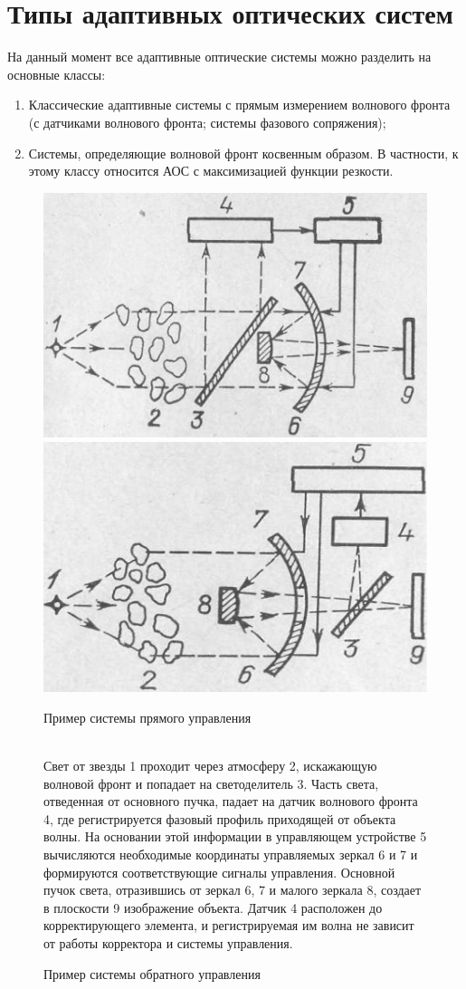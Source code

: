 \documentclass[pscyr]{hedwork}
\begin{document}
\section{Типы адаптивных оптических систем}

На данный момент все адаптивные оптические системы можно разделить на 
основные классы:
\begin{enumerate}
  \item Классические адаптивные системы с прямым измерением волнового
    фронта (с датчиками волнового фронта; системы фазового сопряжения);
  \item Системы, определяющие волновой фронт косвенным образом. В частности, к
    этому классу относится АОС с максимизацией функции резкости. 
\end{enumerate}

\begin{figure}[ht]
  \center
  \includegraphics[width=.47\textwidth]{ds_1_1} \hfill
  \includegraphics[width=.47\textwidth]{ds_1_2} \\
  \parbox{.47\textwidth}{ \caption{Пример системы прямого управления}
    \label{pic1} } \hfill
  \parbox{.47\textwidth}{ \caption{Пример системы обратного управления}
    \label{pic2} } \\
  {
  \footnotesize
    Свет от звезды 1 проходит через атмосферу 2, искажающую волновой фронт и
    попадает на светоделитель 3. Часть света, отведенная от основного пучка,
    падает на датчик волнового фронта 4, где регистрируется фазовый профиль
    приходящей от объекта волны. На основании этой информации в управляющем
    устройстве 5 вычисляются необходимые координаты управляемых зеркал 6 и 7 и
    формируются соответствующие сигналы управления. Основной пучок света,
    отразившись от зеркал 6, 7 и малого зеркала 8, создает в плоскости 9
    изображение объекта. Датчик 4 расположен до корректирующего элемента,
    и регистрируемая им волна не зависит от работы корректора и системы
    управления. 
  }
\end{figure}
\end{document}
